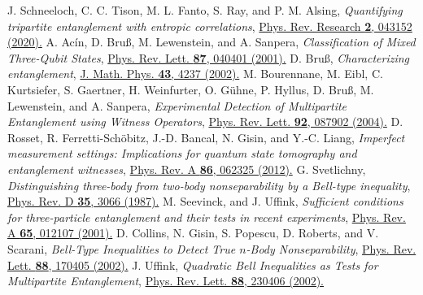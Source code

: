 \documentclass[pra,a4paper,aps,twocolumn,showpacs,superscriptaddress,groupedaddress]{revtex4}
\begin{document}
\begin{thebibliography}{1}
 J. Schneeloch, C. C. Tison, M. L. Fanto, S. Ray, and P. M. Alsing, \emph{Quantifying tripartite entanglement with entropic correlations}, \href{https://journals.aps.org/prresearch/abstract/10.1103/PhysRevResearch.2.043152}{Phys. Rev. Research {\bf 2}, 043152 (2020).}
 A. Ac\'{i}n, D. Bru\ss, M. Lewenstein, and A. Sanpera, \emph{Classification of Mixed Three-Qubit States}, \href{https://journals.aps.org/prl/abstract/10.1103/PhysRevLett.87.040401}{Phys. Rev. Lett. {\bf 87}, 040401 (2001).}
D. Bru\ss,  \emph{Characterizing entanglement}, \href{https://aip.scitation.org/doi/10.1063/1.1494474}{J. Math. Phys. {\bf 43}, 4237 (2002).}
 M. Bourennane, M. Eibl, C. Kurtsiefer, S. Gaertner, H. Weinfurter, O. G\"{u}hne, P. Hyllus, D. Bru\ss, M. Lewenstein, and A. Sanpera, \emph{Experimental Detection of Multipartite Entanglement using Witness Operators}, \href{https://journals.aps.org/prl/abstract/10.1103/PhysRevLett.92.087902}{Phys. Rev. Lett. {\bf 92}, 087902 (2004).}
 D. Rosset, R. Ferretti-Sch\"{o}bitz, J.-D. Bancal, N. Gisin, and Y.-C. Liang, \emph{Imperfect measurement settings: Implications for quantum state tomography and entanglement witnesses}, \href{https://journals.aps.org/pra/abstract/10.1103/PhysRevA.86.062325}{Phys. Rev. A {\bf 86}, 062325 (2012).}
 G. Svetlichny, \emph{Distinguishing three-body from two-body nonseparability by a Bell-type inequality}, \href{https://journals.aps.org/prd/abstract/10.1103/PhysRevD.35.3066}{Phys. Rev. D {\bf 35}, 3066 (1987).}
 M. Seevinck, and J. Uffink, \emph{Sufficient conditions for three-particle entanglement and their tests in recent experiments}, \href{https://journals.aps.org/pra/abstract/10.1103/PhysRevA.65.012107}{Phys. Rev. A \textbf{65}, 012107 (2001).}
 D. Collins, N. Gisin, S. Popescu, D. Roberts, and V. Scarani, \emph{Bell-Type Inequalities to Detect True $n$-Body Nonseparability}, \href{https://journals.aps.org/prl/abstract/10.1103/PhysRevLett.88.170405}{Phys. Rev. Lett. {\bf 88}, 170405 (2002).}
 J. Uffink, \emph{Quadratic Bell Inequalities as Tests for Multipartite Entanglement}, \href{https://journals.aps.org/prl/abstract/10.1103/PhysRevLett.88.230406}{Phys. Rev. Lett. {\bf 88}, 230406 (2002).}

\end{thebibliography}
\end{document}
